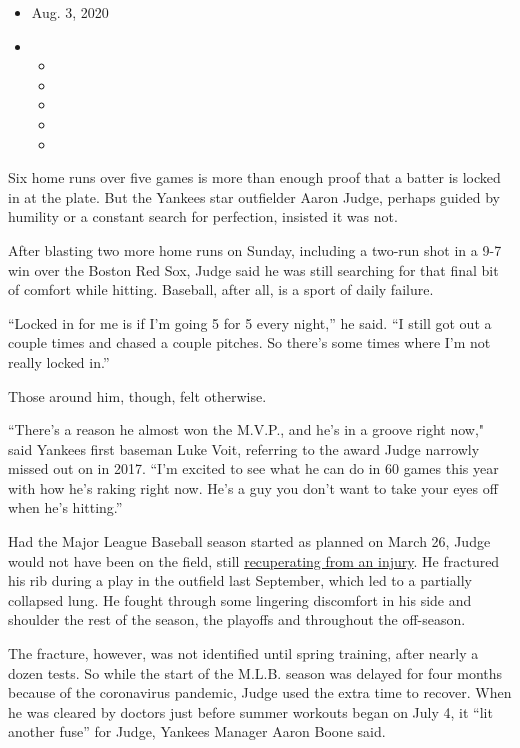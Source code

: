 \begin{itemize}
\item
  Aug. 3, 2020
\item
  \begin{itemize}
  \item
  \item
  \item
  \item
  \item
  \end{itemize}
\end{itemize}

Six home runs over five games is more than enough proof that a batter is
locked in at the plate. But the Yankees star outfielder Aaron Judge,
perhaps guided by humility or a constant search for perfection, insisted
it was not.

After blasting two more home runs on Sunday, including a two-run shot in
a 9-7 win over the Boston Red Sox, Judge said he was still searching for
that final bit of comfort while hitting. Baseball, after all, is a sport
of daily failure.

``Locked in for me is if I'm going 5 for 5 every night,'' he said. ``I
still got out a couple times and chased a couple pitches. So there's
some times where I'm not really locked in.''

Those around him, though, felt otherwise.

``There's a reason he almost won the M.V.P., and he's in a groove right
now," said Yankees first baseman Luke Voit, referring to the award Judge
narrowly missed out on in 2017. ``I'm excited to see what he can do in
60 games this year with how he's raking right now. He's a guy you don't
want to take your eyes off when he's hitting.''

Had the Major League Baseball season started as planned on March 26,
Judge would not have been on the field, still
\href{https://www.nytimes.com/2020/03/06/sports/baseball/aaron-judge-yankees.html}{recuperating
from an injury}. He fractured his rib during a play in the outfield last
September, which led to a partially collapsed lung. He fought through
some lingering discomfort in his side and shoulder the rest of the
season, the playoffs and throughout the off-season.

The fracture, however, was not identified until spring training, after
nearly a dozen tests. So while the start of the M.L.B. season was
delayed for four months because of the coronavirus pandemic, Judge used
the extra time to recover. When he was cleared by doctors just before
summer workouts began on July 4, it ``lit another fuse'' for Judge,
Yankees Manager Aaron Boone said.

